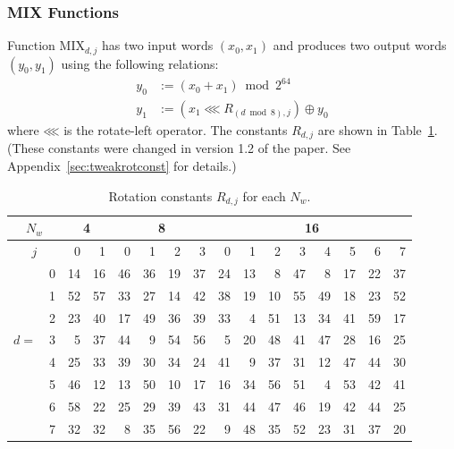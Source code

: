 \documentclass[11pt,twoside]{article}
\newcommand{\xor}{\oplus}
\newcommand{\rol}{\mathbin{\lll}}
\def\symdef#1{\label{symdef:#1}}
\newcommand{\mix}{\text{MIX}}
\begin{document}
\subsubsection{MIX Functions}

Function $\mix_{d,j}$ has two input words $(x_0, x_1)$\symdef{x0x1} and produces two output words $(y_0, y_1)$\symdef{y0y1} using the following relations:
\begin{align*}
  y_0 &:= (x_0 + x_1) \bmod 2^{64}\\
  y_1 &:= (x_1 \rol R_{(d \bmod 8),j}) \xor y_0
\end{align*}
where $\rol$ is the rotate-left operator. The constants $R_{d,j}$ are shown in Table~\ref{tab:rotations}.  (These constants were changed in version 1.2 of the paper.  See Appendix~\ref{sec:tweakrotconst} for details.)
%
\begin{table}[htbp]
  \begin{center}
    \begin{tabular}{|cc|rr|rrrr|rrrrrrrr|}
    \hline
    \multicolumn{2}{|c|}{$N_w$}&\multicolumn{2}{c|}{4}&\multicolumn{4}{c|}{8}&\multicolumn{8}{c|}{16}\\
    \hline
    \multicolumn{2}{|c|}{$j$}& 0 & 1 & 0 & 1 & 2 & 3 & 0 & 1 & 2 & 3 & 4 & 5 & 6 & 7\\
    \hline
    \hline
            & 0 &  14 & 16 &   46 & 36 & 19 & 37 &    24 & 13 &  8 & 47 &  8 & 17 & 22 & 37 \\
            & 1 &  52 & 57 &   33 & 27 & 14 & 42 &    38 & 19 & 10 & 55 & 49 & 18 & 23 & 52 \\
            & 2 &  23 & 40 &   17 & 49 & 36 & 39 &    33 &  4 & 51 & 13 & 34 & 41 & 59 & 17 \\
    $d =$   & 3 &   5 & 37 &   44 &  9 & 54 & 56 &     5 & 20 & 48 & 41 & 47 & 28 & 16 & 25 \\
            & 4 &  25 & 33 &   39 & 30 & 34 & 24 &    41 &  9 & 37 & 31 & 12 & 47 & 44 & 30 \\
            & 5 &  46 & 12 &   13 & 50 & 10 & 17 &    16 & 34 & 56 & 51 &  4 & 53 & 42 & 41 \\
            & 6 &  58 & 22 &   25 & 29 & 39 & 43 &    31 & 44 & 47 & 46 & 19 & 42 & 44 & 25 \\
            & 7 &  32 & 32 &    8 & 35 & 56 & 22 &     9 & 48 & 35 & 52 & 23 & 31 & 37 & 20 \\
       \hline
    \end{tabular}
  \end{center}\caption{Rotation constants $R_{d,j}$ for each $N_w$.}\symdef{R_dj}
  \label{tab:rotations}
\end{table}
%
\end{document}
